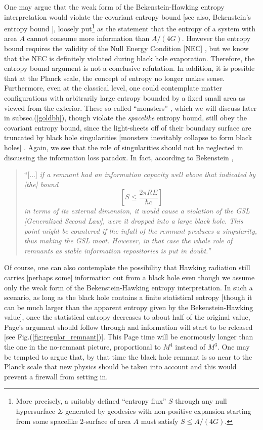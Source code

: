 \documentclass[12pt]{article}
\newcommand{\2}{$^2$}
\newcommand{\3}{$^3$}
\newcommand{\4}{$_4$}
\newcommand{\5}{$_5$}
\begin{document}
One may argue that the weak form of the Bekenstein-Hawking entropy interpretation would violate the covariant entropy bound \cite{Bousso:1999xy} [see also, Bekenstein's entropy bound \cite{287, 9307035}], loosely put\footnote{More precisely, a suitably defined ``entropy flux'' $S$ through any null hypersurface $\Sigma$ generated by geodesics with non-positive expansion starting from some spacelike 2-surface of area $A$ must satisfy $S\leqslant A/(4G)$.} as the statement that the entropy of a system with area $A$ cannot consume more information than $A/(4G)$. However the entropy bound requires the validity of the Null Energy Condition [NEC] \cite{FMW}, but we know that the NEC is definitely violated during black hole evaporation. Therefore, the entropy bound argument is not a conclusive refutation. In addition, it is possible that at the Planck scale, the concept of entropy no longer makes sense. 
Furthermore, even at the classical level, one could contemplate matter configurations with arbitrarily large entropy bounded by a fixed small area as viewed from the exterior. These so-called ``monsters'' \cite{hsu1,hsu2}, which we will discuss later in subsec.(\ref{goldbh}), though violate the \emph{spacelike} entropy bound, still obey the covariant entropy bound, 
since the light-sheets off of their boundary surface are truncated by black hole singularities [monsters inevitably collapse to form black holes] \cite{hsu2, bousso}. Again, we see that the role of singularities should not be neglected in discussing the information loss paradox. In fact, according to Bekenstein \cite{9307035}, 
\begin{quote}
``[...]\emph{ if a remnant had an information capacity well above that indicated by [the] bound 
\begin{equation} \left[S \leqslant \frac{ 2\pi R E}{\hbar c}\right] \nonumber  \end{equation}
 in terms of its external
dimension, it would cause a violation of the GSL [Generalized Second Law], were it dropped into a large black hole. This point might be
countered if the infall of the remnant produces a singularity, thus making the GSL moot. However, in that case
the whole role of remnants as stable information repositories is put in doubt.''}
\end{quote}

Of course, one can also contemplate the possibility that Hawking radiation still carries [perhaps some] information out from a black hole even though we assume only the weak form of the Bekenstein-Hawking entropy interpretation. In such a scenario, as long as the black hole contains a finite statistical entropy [though it can be much larger than the apparent entropy given by the Bekenstein-Hawking value], once the statistical entropy decreases to about half of the original value, Page's argument should follow through and information will start to be released [see Fig.(\ref{fig:regular_remnant})]. This Page time will be enormously longer than the one in the no-remnant picture, proportional to $M^4$ instead of $M^3$. One may be tempted to argue that, by that time the black hole remnant is so near to the Planck scale that new physics should be taken into account and this would prevent a firewall from setting in. 
\end{document}
